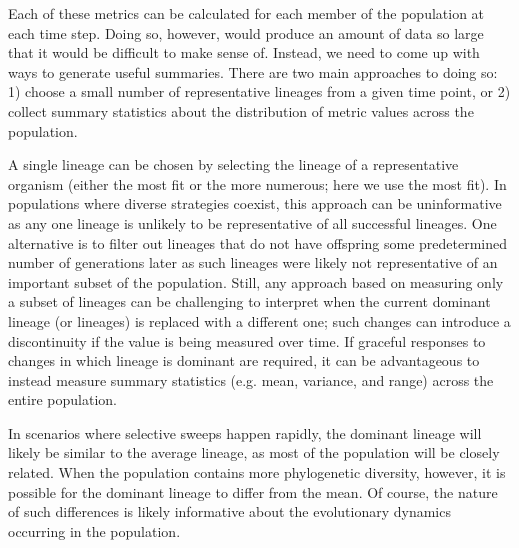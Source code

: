 \documentclass[letterpaper]{article}
\begin{document}
Each of these metrics can be calculated for each member of the population at each time step. Doing so, however, would produce an amount of data so large that it would be difficult to make sense of. Instead, we need to come up with ways to generate useful summaries. There are two main approaches to doing so: 1) choose a small number of representative lineages from a given time point, or 2) collect summary statistics about the distribution of metric values across the population.

A single lineage can be chosen by selecting the lineage of %
a representative
organism (either the most fit or the more numerous; here we use the most fit). In populations where diverse strategies coexist, this approach can be uninformative as any one lineage is unlikely to be representative of all successful lineages. One alternative %
is to filter out lineages that do not have offspring some predetermined number of generations later as such lineages were likely not representative of an important subset of the population. Still, any approach based on measuring only a subset of lineages can be challenging to interpret when the current dominant lineage (or lineages) is replaced with a different one; such changes can introduce a discontinuity if the value is being measured over time. If graceful responses to changes in which lineage is dominant are required, it can be advantageous to instead measure summary statistics (e.g. mean, variance, and range) across the entire population. 

In scenarios where selective sweeps happen rapidly, the dominant lineage will likely be similar to the average lineage,
as most of the population will be closely related. When the population contains more phylogenetic diversity, however, it is possible for the dominant lineage to differ from the mean. Of course, the nature of such differences is likely informative about the evolutionary dynamics occurring in the population. 
\end{document}
